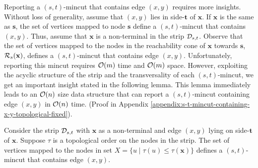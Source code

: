 Reporting a $(s,t)$-mincut that contains edge $(x,y)$ requires more insights. Without loss of generality, assume that $(x,y)$ lies in side-$\mathbf t$ of $\mathbf x$. If $\mathbf x$ is the same as $\mathbf s$, the set of vertices mapped to node $\mathbf s$ define a $(s,t)$-mincut that contains $(x,y)$. Thus, assume that $\mathbf x$ is a non-terminal in the strip ${\cal D}_{s,t}$. Observe that the set of vertices mapped to the nodes in the reachability cone of $\mathbf x$ towards $\mathbf s$, ${\cal R}_s({\mathbf x})$, defines a $(s,t)$-mincut that contains edge $(x,y)$. Unfortunately, reporting this mincut requires ${\cal O}(m)$ time and ${\cal O}(m)$ space. However, exploiting the acyclic structure of the strip and the transversality of each $(s,t)$-mincut, we get an important insight stated in the following lemma. This lemma immediately leads to an ${\cal O}(n)$ size data structure that can report a $(s,t)$-mincut containing edge $(x,y)$ in ${\cal O}(n)$ time. (Proof in Appendix \ref{appendix:s-t-mincut-containing-x-y-topological-fixed}).

\begin{lemma}
\label{lem:s-t-mincut-containing-x-y-topological-fixed}
Consider the strip ${\cal D}_{s,t}$ with ${\mathbf x}$ as a non-terminal and edge $(x,y)$ lying on side-${\mathbf t}$ of ${\mathbf x}$. Suppose $\tau$ is a topological order on the nodes in the strip. The set of vertices mapped to the nodes in set $X = \{u \;|\; \tau(u) \leq \tau(\mathbf x)\}$ defines a $(s,t)$-mincut that contains edge $(x,y)$.
\end{lemma}



